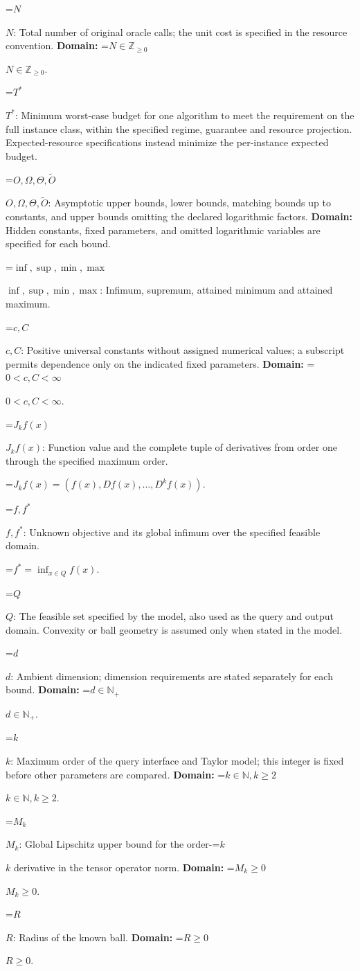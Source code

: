 \documentclass[10pt,a4paper]{article}
\newcommand{\AtlasMath}[1]{\par\begingroup\centering\setbox0=\hbox{$\displaystyle #1$}\ifdim\wd0>1.4\linewidth\typeout{ATLAS WIDE FORMULA: \the\wd0}\fi\ifdim\wd0>\linewidth\resizebox{\linewidth}{!}{\box0}\else\box0\fi\par\endgroup}
\newcommand{\AtlasInlineMath}[1]{\begingroup\setbox0=\hbox{$#1$}\ifdim\wd0>.4\linewidth\endgroup\AtlasMath{#1}\else\endgroup$#1$\fi}
\begin{document}
\AtlasInlineMath{N}: Total number of original oracle calls; the unit cost is specified in the resource convention. \textbf{Domain:} \AtlasInlineMath{N\in\mathbb{Z}_{\ge0}}.

\AtlasInlineMath{T^*}: Minimum worst-case budget for one algorithm to meet the requirement on the full instance class, within the specified regime, guarantee and resource projection. Expected-resource specifications instead minimize the per-instance expected budget.

\AtlasInlineMath{O,\Omega,\Theta,\widetilde{O}}: Asymptotic upper bounds, lower bounds, matching bounds up to constants, and upper bounds omitting the declared logarithmic factors. \textbf{Domain:} Hidden constants, fixed parameters, and omitted logarithmic variables are specified for each bound.

\AtlasInlineMath{\inf,\sup,\min,\max}: Infimum, supremum, attained minimum and attained maximum.

\AtlasInlineMath{c,C}: Positive universal constants without assigned numerical values; a subscript permits dependence only on the indicated fixed parameters. \textbf{Domain:} \AtlasInlineMath{0<c,C<\infty}.

\AtlasInlineMath{J_{k}f(x)}: Function value and the complete tuple of derivatives from order one through the specified maximum order.


\AtlasMath{J_{k}f(x)=(f(x),Df(x),\ldots,D^{k}f(x)).}


\AtlasInlineMath{f,f^*}: Unknown objective and its global infimum over the specified feasible domain.


\AtlasMath{f^*=\inf_{x\in Q}f(x).}


\AtlasInlineMath{Q}: The feasible set specified by the model, also used as the query and output domain. Convexity or ball geometry is assumed only when stated in the model.

\AtlasInlineMath{d}: Ambient dimension; dimension requirements are stated separately for each bound. \textbf{Domain:} \AtlasInlineMath{d\in\mathbb{N}_{+}}.

\AtlasInlineMath{k}: Maximum order of the query interface and Taylor model; this integer is fixed before other parameters are compared. \textbf{Domain:} \AtlasInlineMath{k\in\mathbb{N}, k\ge2}.

\AtlasInlineMath{M_k}: Global Lipschitz upper bound for the order-\AtlasInlineMath{k} derivative in the tensor operator norm. \textbf{Domain:} \AtlasInlineMath{M_k\ge0}.

\AtlasInlineMath{R}: Radius of the known ball. \textbf{Domain:} \AtlasInlineMath{R\ge0}.
\end{document}
